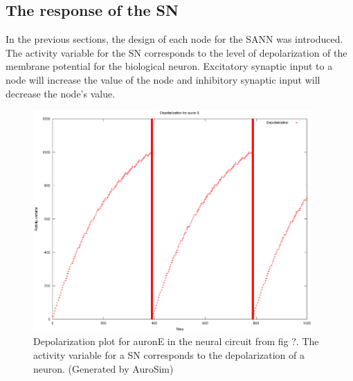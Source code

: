 \subsection{The response of the SN}
	In the previous sections, the design of each node for the SANN was introduced.
	The activity variable for the SN corresponds to the level of depolarization of the membrane potential for the biological neuron.
	Excitatory synaptic input to a node will increase the value of the node and inhibitory synaptic input will decrease the node's value.

	\begin{figure}[hb!tp]
		\centering 				%
		\includegraphics[width=0.95\textwidth]{depolPlotAvSN/eps_auronE-depol.eps}
		\caption{Depolarization plot for auronE in the neural circuit from fig ?. The activity variable for a SN corresponds to the depolarization of a neuron.
		(Generated by AuroSim)} %
		\label{figAuronE}
	\end{figure}


